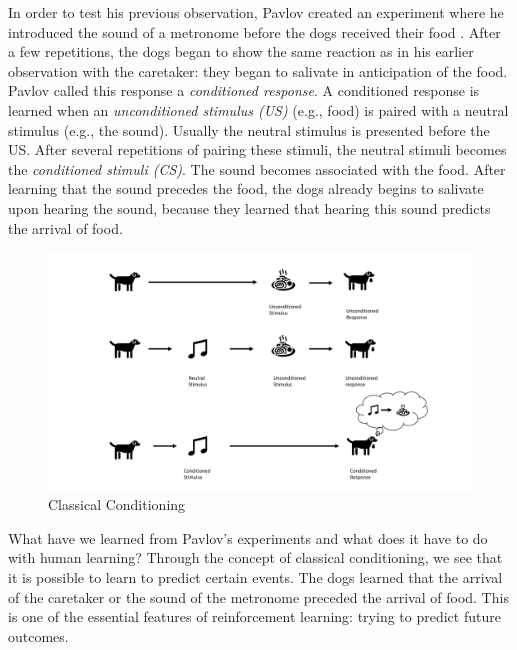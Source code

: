 In order to test his previous observation, Pavlov created an experiment where he introduced the sound of a metronome before the dogs received their food \citep{pavlov1927conditional}. 
After a few repetitions, the dogs began to show the same reaction as in his earlier observation with the caretaker: they began to salivate in anticipation of the food.
Pavlov called this response a \emph{conditioned response}. A conditioned response is learned when an \emph{unconditioned stimulus (US)} (e.g., food) is paired with a neutral stimulus (e.g., the sound). Usually the neutral stimulus is presented before the US. After several repetitions of pairing these stimuli, the neutral stimuli becomes the \emph{conditioned stimuli (CS)}. The sound becomes associated with the food. After learning that the sound precedes the food, the dogs already begins to salivate upon hearing the sound, because they learned that hearing this sound predicts the arrival of food. %

\begin{figure}
    \centering
    \includegraphics[width=1\textwidth]{Plots/ClassicalConditioning.pdf}
    \caption{Classical Conditioning}
    \label{fig:Classical_Conditioning}
\end{figure}

What have we learned from Pavlov's experiments and what does it have to do with human learning? Through the concept of classical conditioning, we see that it is possible to learn to predict certain events. The dogs learned that the arrival of the caretaker or the sound of the metronome preceded the arrival of food. This is one of the essential features of reinforcement learning: trying to predict future outcomes. %



